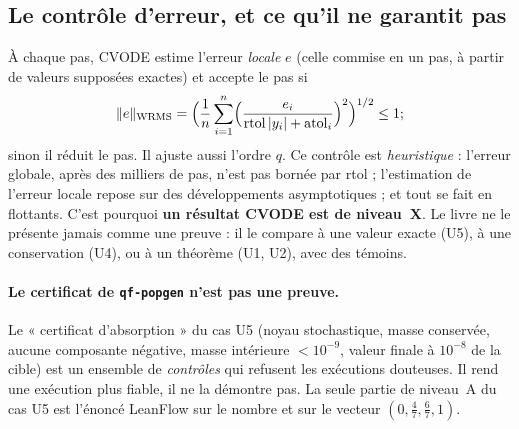 \subsection{Le contrôle d'erreur, et ce qu'il ne garantit pas}
À chaque pas, CVODE estime l'erreur \emph{locale} $e$ (celle commise en un pas, à partir de valeurs supposées exactes)
et accepte le pas si
\[\|e\|_{\mathrm{WRMS}}=\Bigl(\frac1n\sum_{i=1}^n\Bigl(\frac{e_i}{\mathrm{rtol}\,|y_i|+\mathrm{atol}_i}\Bigr)^2\Bigr)^{1/2}\le1 ;\]
sinon il réduit le pas. Il ajuste aussi l'ordre $q$. Ce contrôle est \emph{heuristique} : l'erreur globale, après des
milliers de pas, n'est pas bornée par rtol ; l'estimation de l'erreur locale repose sur des développements
asymptotiques ; et tout se fait en flottants. C'est pourquoi \textbf{un résultat CVODE est de niveau~X}. Le livre ne le
présente jamais comme une preuve : il le compare à une valeur exacte (U5), à une conservation (U4), ou à un théorème
(U1, U2), avec des témoins.

\paragraph{Le certificat de \texttt{qf-popgen} n'est pas une preuve.} Le « certificat d'absorption » du cas U5
(noyau stochastique, masse conservée, aucune composante négative, masse intérieure $<10^{-9}$, valeur finale à
$10^{-8}$ de la cible) est un ensemble de \emph{contrôles} qui refusent les exécutions douteuses. Il rend une exécution
plus fiable, il ne la démontre pas. La seule partie de niveau~A du cas U5 est l'énoncé LeanFlow sur le nombre
 et sur le vecteur $(0,\frac47,\frac67,1)$.

